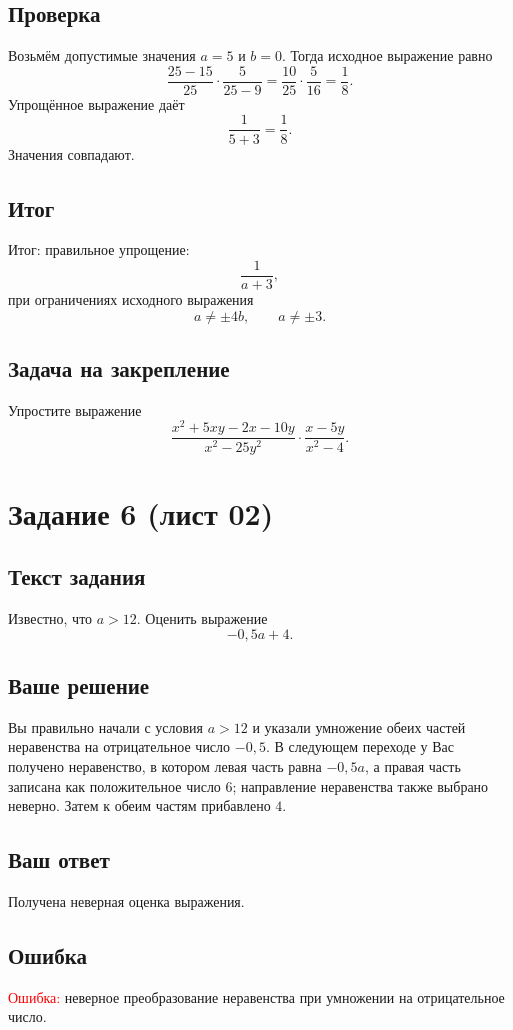 \documentclass[12pt,a4paper]{article}
\newcommand{\errlabel}{\textcolor{red}{Ошибка:}}
\newcommand{\resultlabel}{\textcolor{teal!60!black}{Итог:}}
\begin{document}
\subsection*{Проверка}
Возьмём допустимые значения $a=5$ и $b=0$. Тогда исходное выражение равно
\[
\frac{25-15}{25}\cdot\frac{5}{25-9}
=\frac{10}{25}\cdot\frac{5}{16}
=\frac18.
\]
Упрощённое выражение даёт
\[
\frac{1}{5+3}=\frac18.
\]
Значения совпадают.

\subsection*{Итог}
\resultlabel{} правильное упрощение:
\[
\boxed{\frac{1}{a+3}},
\]
при ограничениях исходного выражения
\[
a\ne \pm 4b,\qquad a\ne \pm 3.
\]

\subsection*{Задача на закрепление}
Упростите выражение
\[
\frac{x^2+5xy-2x-10y}{x^2-25y^2}\cdot
\frac{x-5y}{x^2-4}.
\]

\newpage
{}\label{task:02-6}
\section*{Задание 6 (лист 02)}

\subsection*{Текст задания}
Известно, что $a>12$. Оценить выражение
\[
-0{,}5a+4.
\]

\subsection*{Ваше решение}
Вы правильно начали с условия $a>12$ и указали умножение обеих частей неравенства на отрицательное число $-0{,}5$. В следующем переходе у Вас получено неравенство, в котором левая часть равна $-0{,}5a$, а правая часть записана как положительное число $6$; направление неравенства также выбрано неверно. Затем к обеим частям прибавлено $4$.

\subsection*{Ваш ответ}
Получена неверная оценка выражения.

\subsection*{Ошибка}
\errlabel{} неверное преобразование неравенства при умножении на отрицательное число.
\end{document}
